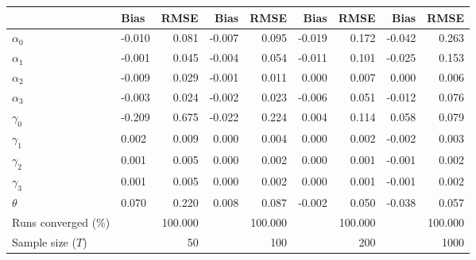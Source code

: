 
\begin{tabular}[t]{llrrrrrrr}
\toprule
  & Bias & RMSE & Bias & RMSE & Bias & RMSE & Bias & RMSE\\
\midrule
$\alpha_{0}$ & -0.010 & 0.081 & -0.007 & 0.095 & -0.019 & 0.172 & -0.042 & 0.263\\
$\alpha_{1}$ & -0.001 & 0.045 & -0.004 & 0.054 & -0.011 & 0.101 & -0.025 & 0.153\\
$\alpha_{2}$ & -0.009 & 0.029 & -0.001 & 0.011 & 0.000 & 0.007 & 0.000 & 0.006\\
$\alpha_{3}$ & -0.003 & 0.024 & -0.002 & 0.023 & -0.006 & 0.051 & -0.012 & 0.076\\
$\gamma_{0}$ & -0.209 & 0.675 & -0.022 & 0.224 & 0.004 & 0.114 & 0.058 & 0.079\\
$\gamma_{1}$ & 0.002 & 0.009 & 0.000 & 0.004 & 0.000 & 0.002 & -0.002 & 0.003\\
$\gamma_{2}$ & 0.001 & 0.005 & 0.000 & 0.002 & 0.000 & 0.001 & -0.001 & 0.002\\
$\gamma_{3}$ & 0.001 & 0.005 & 0.000 & 0.002 & 0.000 & 0.001 & -0.001 & 0.002\\
$\theta$ & 0.070 & 0.220 & 0.008 & 0.087 & -0.002 & 0.050 & -0.038 & 0.057\\
Runs converged (\%) &  & 100.000 &  & 100.000 &  & 100.000 &  & 100.000\\
Sample size ($T$) &  & 50 &  & 100 &  & 200 &  & 1000\\
\bottomrule
\end{tabular}
